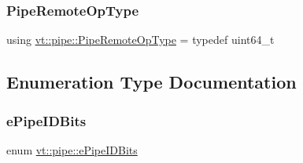 \mbox{\label{namespacevt_1_1pipe_a9f156f00d06693969d89a230a38eab52}} 
\subsubsection{\texorpdfstring{Pipe\+Remote\+Op\+Type}{PipeRemoteOpType}}
{\footnotesize\ttfamily using \hyperlink{namespacevt_1_1pipe_a9f156f00d06693969d89a230a38eab52}{vt\+::pipe\+::\+Pipe\+Remote\+Op\+Type} = typedef uint64\+\_\+t}



\subsection{Enumeration Type Documentation}
\mbox{\label{namespacevt_1_1pipe_a21eef17afd7b326e3b65894dffa25901}} 
\subsubsection{\texorpdfstring{e\+Pipe\+I\+D\+Bits}{ePipeIDBits}}
{\footnotesize\ttfamily enum \hyperlink{namespacevt_1_1pipe_a21eef17afd7b326e3b65894dffa25901}{vt\+::pipe\+::e\+Pipe\+I\+D\+Bits}}

